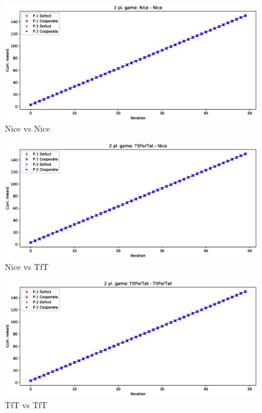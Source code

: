 \documentclass[journal,a4paper,10pt,twoside]{IEEEtran} %
\begin{document}
\begin{figure}[!ht]
    \centering
    \includegraphics[width=1\columnwidth]{../img/ipd2p/ipd2p-rewards-Nice-Nice}
    \caption{Nice vs Nice}
    \label{fig:nicevsnice}
\end{figure}

\begin{figure}[!ht]
    \centering
    \includegraphics[width=1\columnwidth]{../img/ipd2p/ipd2p-rewards-TitForTat-Nice}
    \caption{Nice vs TfT}
    \label{fig:nicevstft}
\end{figure}

\begin{figure}[!ht]
    \centering
    \includegraphics[width=1\columnwidth]{../img/ipd2p/ipd2p-rewards-TitForTat-TitForTat}
    \caption{TfT vs TfT}
    \label{fig:tftvstft}
\end{figure}
\end{document}

